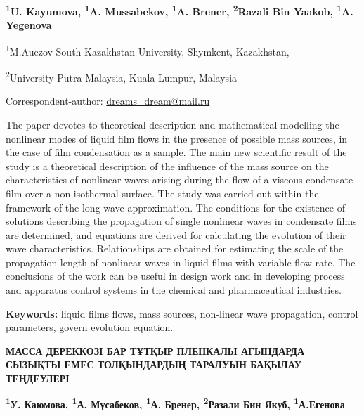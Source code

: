 
\begin{articleheader}

{\bfseries
\textsuperscript{1}U. Kayumova\textsuperscript{\envelope },
\textsuperscript{1}A. Mussabekov,
\textsuperscript{1}A. Brener,
\textsuperscript{2}Razali Bin Yaakob,
\textsuperscript{1}A. Yegenova
}
\end{articleheader}

\begin{affiliation}
\textsuperscript{1}M.Auezov South Kazakhstan University, Shymkent, Kazakhstan,

\textsuperscript{2}University Putra Malaysia, Kuala-Lumpur, Malaysia

\raggedright \textsuperscript{\envelope }Correspondent-author: \href{mailto:dreams\_dream@mail.ru}{dreams\_dream@mail.ru}
\end{affiliation}

The paper devotes to theoretical description and mathematical modelling
the nonlinear modes of liquid film flows in the presence of possible
mass sources, in the case of film condensation as a sample. The main new
scientific result of the study is a theoretical description of the
influence of the mass source on the characteristics of nonlinear waves
arising during the flow of a viscous condensate film over a
non-isothermal surface. The study was carried out within the framework
of the long-wave approximation. The conditions for the existence of
solutions describing the propagation of single nonlinear waves in
condensate films are determined, and equations are derived for
calculating the evolution of their wave characteristics. Relationships
are obtained for estimating the scale of the propagation length of
nonlinear waves in liquid films with variable flow rate. The conclusions
of the work can be useful in design work and in developing process and
apparatus control systems in the chemical and pharmaceutical industries.

{\bfseries Keywords:} liquid films flows, mass sources, non-linear wave
propagation, control parameters, govern evolution equation.

\begin{articleheader}
{\bfseries МАССА ДЕРЕККӨЗІ БАР ТҰТҚЫР ПЛЕНКАЛЫ АҒЫНДАРДА СЫЗЫҚТЫ ЕМЕС
ТОЛҚЫНДАРДЫҢ ТАРАЛУЫН БАҚЫЛАУ ТЕҢДЕУЛЕРІ}

{\bfseries
\textsuperscript{1}У. Каюмова\textsuperscript{\envelope },
\textsuperscript{1}А. Мұсабеков,
\textsuperscript{1}А. Бренер,
\textsuperscript{2}Разали Бин Якуб,
\textsuperscript{1}А.Егенова
}
\end{articleheader}


